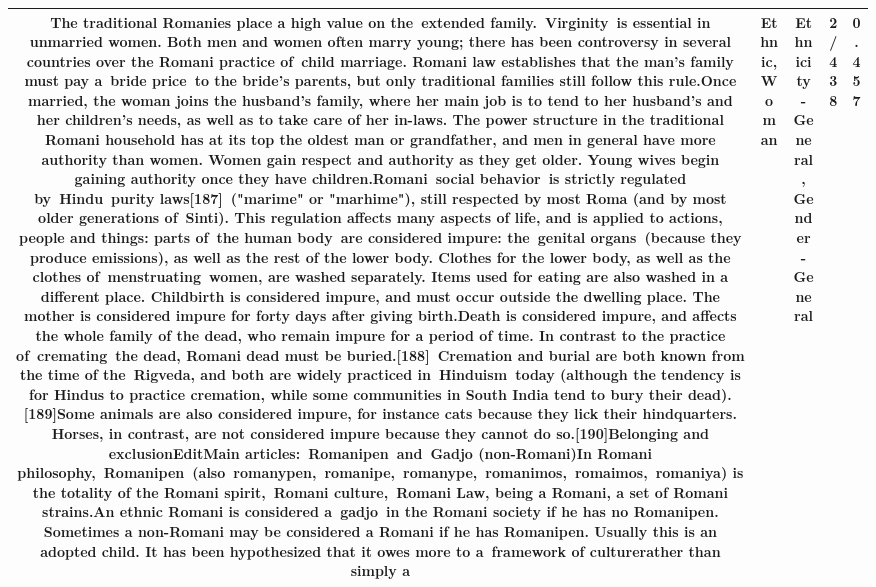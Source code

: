 \documentclass[11pt]{article}
\newlength\mylength
\begin{document}
\begin{center}
\begin{longtable}{|C{.65\mylength}|C{.30\mylength}|C{.12\mylength}|C{.12\mylength}|C{.12\mylength}|}
  \small The traditional Romanies place a high value on the extended family. Virginity is essential in unmarried women. Both men and women often marry young; there has been controversy in several countries over the Romani practice of child marriage. Romani law establishes that the man's family must pay a bride price to the bride's parents, but only traditional families still follow this rule.Once married, the \textbf{woman} joins the husband's family, where her main job is to tend to her husband's and her children's needs, as well as to take care of her in-laws. The power structure in the traditional Romani household has at its top the oldest man or grandfather, and men in general have more authority than women. Women gain respect and authority as they get older. Young wives begin gaining authority once they have children.Romani social behavior is strictly regulated by Hindu purity laws[187] ("marime" or "marhime"), still respected by most Roma (and by most older generations of Sinti). This regulation affects many aspects of life, and is applied to actions, people and things: parts of the human body are considered impure: the genital organs (because they produce emissions), as well as the rest of the lower body. Clothes for the lower body, as well as the clothes of menstruating women, are washed separately. Items used for eating are also washed in a different place. Childbirth is considered impure, and must occur outside the dwelling place. The mother is considered impure for forty days after giving birth.Death is considered impure, and affects the whole family of the dead, who remain impure for a period of time. In contrast to the practice of cremating the dead, Romani dead must be buried.[188] Cremation and burial are both known from the time of the Rigveda, and both are widely practiced in Hinduism today (although the tendency is for Hindus to practice cremation, while some communities in South India tend to bury their dead).[189]Some animals are also considered impure, for instance cats because they lick their hindquarters. Horses, in contrast, are not considered impure because they cannot do so.[190]Belonging and exclusionEditMain articles: Romanipen and Gadjo (non-Romani)In Romani philosophy, Romanipen (also romanypen, romanipe, romanype, romanimos, romaimos, romaniya) is the totality of the Romani spirit, Romani culture, Romani Law, being a Romani, a set of Romani strains.An \textbf{ethnic} Romani is considered a gadjo in the Romani society if he has no Romanipen. Sometimes a non-Romani may be considered a Romani if he has Romanipen. Usually this is an adopted child. It has been hypothesized that it owes more to a framework of culturerather than simply a\normalsize   & Ethnic, Woman & Ethnicity - General, Gender - General & 2/438 & 0.457 \\  \hline

\end{longtable}
\end{center}
\end{document}
